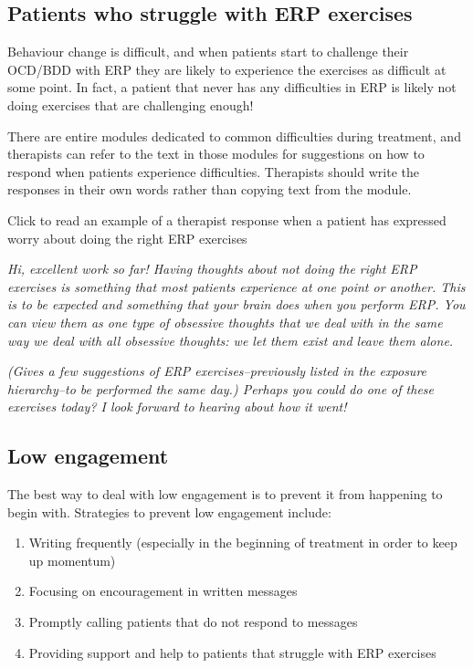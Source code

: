 \documentclass[]{book}
\providecommand{\tightlist}{%
  \setlength{\itemsep}{0pt}\setlength{\parskip}{0pt}}
\theoremstyle{definition}
\theoremstyle{definition}
\theoremstyle{definition}
\theoremstyle{remark}
\begin{document}
\hypertarget{patients-who-struggle-with-erp-exercises}{%
\subsection{Patients who struggle with ERP
exercises}\label{patients-who-struggle-with-erp-exercises}}

Behaviour change is difficult, and when patients start to challenge
their OCD/BDD with ERP they are likely to experience the exercises as
difficult at some point. In fact, a patient that never has any
difficulties in ERP is likely not doing exercises that are challenging
enough!

There are entire modules dedicated to common difficulties during
treatment, and therapists can refer to the text in those modules for
suggestions on how to respond when patients experience difficulties.
Therapists should write the responses in their own words rather than
copying text from the module.

 Click to read an example of a therapist response when a patient has
expressed worry about doing the right ERP exercises

\emph{Hi, excellent work so far! Having thoughts about not doing the
right ERP exercises is something that most patients experience at one
point or another. This is to be expected and something that your brain
does when you perform ERP. You can view them as one type of obsessive
thoughts that we deal with in the same way we deal with all obsessive
thoughts: we let them exist and leave them alone.}

\emph{(Gives a few suggestions of ERP exercises--previously listed in
the exposure hierarchy--to be performed the same day.) Perhaps you could
do one of these exercises today? I look forward to hearing about how it
went!}

\hypertarget{low-engagement}{%
\subsection{Low engagement}\label{low-engagement}}

The best way to deal with low engagement is to prevent it from happening
to begin with. Strategies to prevent low engagement include:

\begin{enumerate}
\def\labelenumi{\arabic{enumi}.}
\tightlist
\item
  Writing frequently (especially in the beginning of treatment in order
  to keep up momentum)
\item
  Focusing on encouragement in written messages
\item
  Promptly calling patients that do not respond to messages
\item
  Providing support and help to patients that struggle with ERP
  exercises
\end{enumerate}
\end{document}
